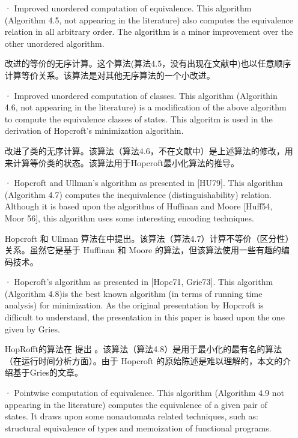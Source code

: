 \begin{itemize}

    \item[·] Improved unordered computation of equivalence. This algorithm (Algorithm 4.5, not appearing in the literature) also computes the equivalence relation in all arbitrary order. The algorithm is a minor improvement over the other unordered algorithm.
 
    改进的等价的无序计算。这个算法(算法4.5，没有出现在文献中)也以任意顺序计算等价关系。该算法是对其他无序算法的一个小改进。

    \item[·] Improved unordered computation of classes. This algorithm (Algorithin 4.6, not appearing in the literature) is a modification of the above algorithm to compute the equivalence classes of states. This algoritm is used in the derivation of Hopcroft's minimization algorithin.
 
     改进了类的无序计算。该算法（算法4.6，不在文献中）是上述算法的修改，用来计算等价类的状态。该算法用于Hopcroft最小化算法的推导。

    \item[·] Hopcroft and Ullman's algorithm as presented in [HU79]. This algorithm (Algorithm 4.7) computes the inequivalence (distinguishability) relation. Although it is based upon the algorithus of Huffinan and Moore [Huff54, Moor 56], this algorithm uses some interesting encoding techniques.
 
    Hopcroft 和 Ullman 算法在\cite{Hu79}中提出。该算法（算法4.7）计算不等价（区分性）关系。虽然它是基于 Huffinan \cite{Huff54}和 Moore \cite{Moor56} 的算法，但该算法使用一些有趣的编码技术。

    \item[·] Hopcroft's algorithm as presented in [Hopc71, Grie73]. This algorithm (Algorithm 4.8)is the best known algorithm (in terms of running time analysis) for minimization. As the original presentation by Hopcroft is diflicult to understand, the presentation in this paper is based upon the one giveu by Gries.
 
    HopRofft的算法在 \cite{Hopc71, Grie73} 提出 。该算法（算法4.8）是用于最小化的最有名的算法（在运行时间分析方面）。由于 Hopcroft 的原始陈述是难以理解的，本文的介绍基于Gries的文章。

    \item[·] Pointwise computation of equivalence. This algorithm (Algorithm 4.9 not appearing in the literature) computes the equivalence of a given pair of states. It draws upon some nonautomata related techniques, such as: structural equivalence of types and memoization of functional programs.
 

\end{itemize}
